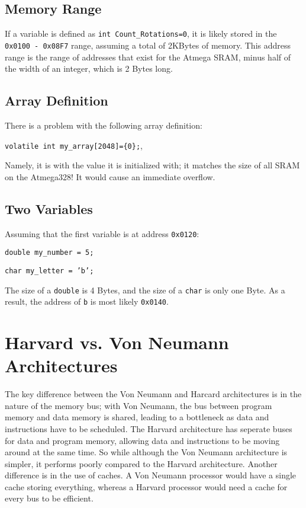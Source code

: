 \documentclass{hw}
\begin{document}
\subsection{Memory Range}
  If a variable is defined as \texttt{int Count\_Rotations=0}, it is likely
  stored in the \texttt{0x0100 - 0x08F7} range, assuming a total of 2KBytes of
  memory. This address range is the range of addresses that exist for the
  Atmega SRAM, minus half of the width of an integer, which is 2 Bytes long.
  \subsection{Array Definition}

  There is a problem with the following array definition: 
  
  \texttt{volatile int
    my\_array[2048]=\{0\};}, 

    Namely, it is with the value it is initialized with; it matches the
    size of all SRAM on the Atmega328! It would cause an immediate overflow.

\subsection{Two Variables}
Assuming that the first variable is at address \texttt{0x0120}:

\texttt{double my\_number = 5;}

\texttt{char my\_letter = 'b';}

The size of a \texttt{double} is 4 Bytes, and the size of a \texttt{char} is
only one Byte. As a result, the address of \texttt{b} is most likely
\texttt{0x0140}.

\section{Harvard vs. Von Neumann Architectures}
The key difference between the Von Neumann and Harcard architectures is in the
nature of the memory bus; with Von Neumann, the bus between program memory and
data memory is shared, leading to a bottleneck as data and instructions
have to be scheduled. The Harvard architecture has
seperate buses for data and program memory, allowing data and instructions
to be moving around at the same time. So while although the Von Neumann
architecture is simpler, it performs poorly compared to the Harvard
architecture. Another difference is in the use of caches. A Von Neumann
processor would have a single cache storing everything, whereas a Harvard
processor would need a cache for every bus to be efficient.
\end{document}
